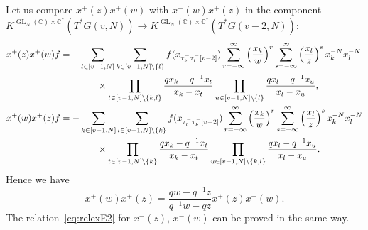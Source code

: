 \documentclass[12pt]{amsart}
\def\Bbb{\mathbb}
\theoremstyle{definition}
\theoremstyle{remark}
\numberwithin{equation}{subsection}
\newcommand{\C}{{\Bbb C}}
\newcommand{\GL}{\operatorname{GL}}
\begin{document}
Let us compare $x^+(z)x^+(w)$ with $x^+(w)x^+(z)$ in the component
$K^{\GL_N(\C)\times\C^*}(T^*G(v,N)) \to
K^{\GL_N(\C)\times\C^*}(T^*G(v-2,N))$:
\begin{equation}\label{eq:x^{(2)}}
\begin{split}
   x^+(z)x^+(w) f & =
   - \sum_{l\in [v-1,N]}\sum_{k\in [v-1,N]\setminus\{l\}}
          f(x_{\tau_k^-\tau_l^-[v-2]})
    \sum_{r=-\infty}^\infty\left(\frac{x_k}{w}\right)^r 
    \sum_{s=-\infty}^\infty\left(\frac{x_l}{z}\right)^s 
    x_k^{-N}x_l^{-N}
\\
    &\qquad\qquad \times
    \prod_{t\in [v-1, N]\setminus \{k,l\}}
    \frac{q x_k - q^{-1} x_t}{x_k - x_t}   
    \prod_{u\in [v-1, N]\setminus \{l\}}
    \frac{q x_l - q^{-1} x_u}{x_l - x_u},   \\
   x^+(w)x^+(z) f & =
   - \sum_{k\in [v-1,N]}\sum_{l\in [v-1,N]\setminus\{k\}}
          f(x_{\tau_l^-\tau_k^-[v-2]})
    \sum_{r=-\infty}^\infty\left(\frac{x_k}{w}\right)^r 
    \sum_{s=-\infty}^\infty\left(\frac{x_l}{z}\right)^s
    x_k^{-N}x_l^{-N}
\\
    &\qquad\qquad\times
    \prod_{t\in [v-1, N]\setminus \{k\}}
    \frac{q x_k - q^{-1} x_t}{x_k - x_t}   
    \prod_{u\in [v-1, N]\setminus \{k,l\}}
    \frac{q x_l - q^{-1} x_u}{x_l - x_u}.
\end{split}
\end{equation}
Hence we have
\begin{equation*}
  x^+(w) x^+(z) = \frac{q w - q^{-1}z}{q^{-1}w - qz} x^+(z) x^+(w).
\end{equation*}
The relation~\eqref{eq:relexE2} for $x^-(z)$, $x^-(w)$ can be proved
in the same way.
\end{document}
